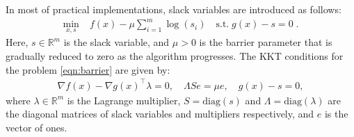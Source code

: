 \documentclass{article}
\begin{document}
In most of practical implementations, slack variables are introduced as follows:
\begin{align}\label{eqn:barrier}
  \min_{x,s } \; & f(x) - \mu \sum_{i=1}^m \log(s_i) \quad \text{s.t.} \; g(x) - s = 0 \;.
\end{align}
Here, $s \in \mathbb{R}^m$ is the slack variable, and $\mu > 0$ is the barrier parameter that is gradually reduced to zero as the algorithm progresses.
The KKT conditions for the problem \cref{eqn:barrier} are given by:
\begin{align}\label{eqn:kkt}
  \nabla f(x) - \nabla g(x)^\top \lambda = 0, \quad
  \Lambda S e = \mu e,\quad
  g(x) - s =   0 ,
\end{align}
where $\lambda \in \mathbb{R}^m$ is the Lagrange multiplier, $S = \text{diag}(s)$
and $\Lambda = \text{diag}(\lambda)$ are the diagonal matrices of slack variables and
multipliers respectively, and $e$ is the vector of ones.
\end{document}
